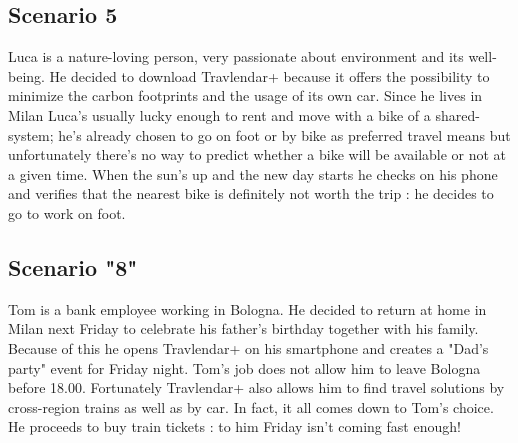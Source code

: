 \subsection {Scenario 5}

Luca is a nature-loving person, very passionate about environment and its well-being. He decided to download Travlendar+ because it offers the possibility to minimize the carbon footprints and the usage of its own car. Since he lives in Milan Luca’s usually lucky enough to rent and move with a bike of a shared-system; he’s already chosen to go on foot or by bike as preferred travel means but unfortunately there’s no way to predict whether a bike will be available or not at a given time. When the sun’s up and the new day starts he checks on his phone and verifies that the nearest bike is definitely not worth the trip : he decides to go to work on foot.


\subsection{Scenario "8"}

Tom is a bank employee working in Bologna. He decided to return at home in Milan next Friday to celebrate his father's birthday together with his family. Because of this he opens Travlendar+ on his smartphone and creates a "Dad's party" event for Friday night. Tom’s job does not allow him to leave Bologna before 18.00. Fortunately Travlendar+ also allows him to find travel solutions by cross-region trains as well as by car. In fact, it all comes down to Tom's choice. He proceeds to buy train tickets : to him Friday isn’t coming fast enough!